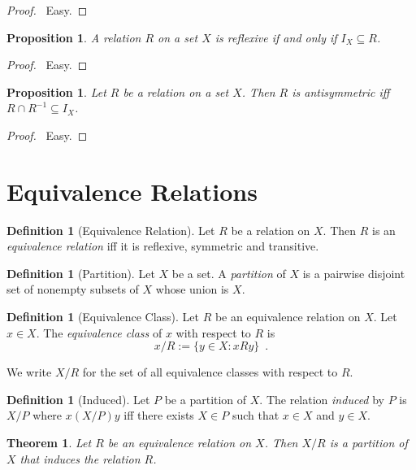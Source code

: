 \documentclass{report}
\let\qed\relax
\newtheorem{prop}[ax]{Proposition}
\newtheorem{thm}[ax]{Theorem}
\theoremstyle{definition}
\newtheorem{df}[ax]{Definition}
\begin{document}
\begin{proof}
\pf\ Easy. \qed
\end{proof}

\begin{prop}
A relation $R$ on a set $X$ is reflexive if and only if $I_X \subseteq R$.
\end{prop}

\begin{proof}
\pf\ Easy. \qed
\end{proof}

\begin{prop}
Let $R$ be a relation on a set $X$. Then $R$ is antisymmetric iff $R \cap R^{-1} \subseteq I_X$.
\end{prop}

\begin{proof}
\pf\ Easy. \qed
\end{proof}

\section{Equivalence Relations}

\begin{df}[Equivalence Relation]
Let $R$ be a relation on $X$. Then $R$ is an \emph{equivalence relation} iff it is reflexive, symmetric and transitive.
\end{df}

\begin{df}[Partition]
Let $X$ be a set. A \emph{partition} of $X$ is a pairwise disjoint set of nonempty subsets of $X$ whose union is $X$.
\end{df}

\begin{df}[Equivalence Class]
Let $R$ be an equivalence relation on $X$. Let $x \in X$. The \emph{equivalence class} of $x$ with respect to $R$ is \[ x / R := \{ y \in X : x R y \} \enspace . \]

We write $X / R$ for the set of all equivalence classes with respect to $R$.
\end{df}

\begin{df}[Induced]
Let $P$ be a partition of $X$. The relation \emph{induced} by $P$ is $X/P$ where $x (X/P) y$ iff there exists $X \in P$ such that $x \in X$ and $y \in X$.
\end{df}

\begin{thm}
Let $R$ be an equivalence relation on $X$. Then $X / R$ is a partition of $X$ that induces the relation $R$.
\end{thm}
\end{document}
